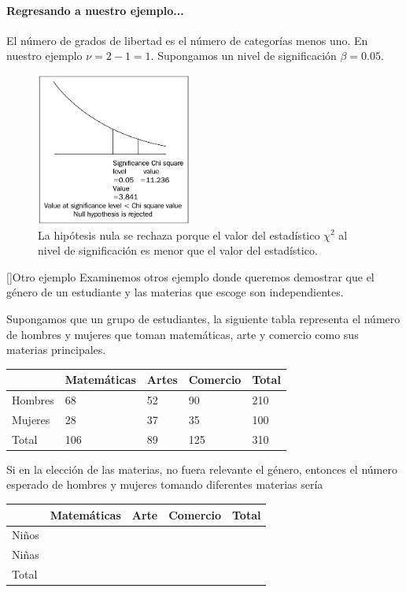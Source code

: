 \paragraph{Regresando a nuestro ejemplo...}
El número de grados de libertad es el número de categorías menos uno.  En nuestro ejemplo $\nu = 2-1 =1.$  Supongamos un nivel de significación $\beta=0.05.$


\begin{figure}
 \centering
 \includegraphics[height=5cm,keepaspectratio=true]{./images/kum0407.png}
 \caption{La hipótesis nula se rechaza porque el valor del estadístico $\chi^2$ al nivel de significación es menor que el valor del estadístico.}
 \label{fig:0407}
\end{figure}


[]{Otro ejemplo}
Examinemos otros ejemplo donde queremos demostrar que el género de un estudiante y las materias que escoge son independientes.


Supongamos que un grupo de estudiantes, la siguiente tabla representa el número de hombres y mujeres que toman matemáticas, arte y comercio como sus materias principales.


\begin{center}
\begin{tabular}{|l|l|l|l|l|}\hline
 & Matemáticas & Artes & Comercio & Total\\\hline
Hombres & 68 & 52 & 90 & 210\\\hline
Mujeres & 28 & 37 & 35 & 100\\\hline
Total & 106 & 89 & 125 & 310\\\hline
\end{tabular}
\end{center}



Si en la elección de las materias, no fuera relevante el género, entonces el número esperado de hombres y mujeres tomando diferentes materias sería
\begin{center}
\begin{tabular}{|l|l|l|l|l|}\hline
 & Matemáticas & Arte & Comercio & Total\\\hline
Niños &  &  &  & \\\hline
Niñas &  &  &  & \\\hline
Total &  &  &  & \\\hline
\end{tabular}
\end{center}



